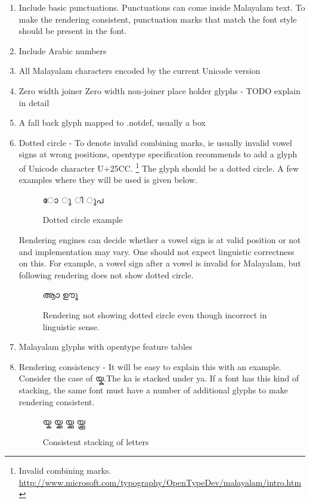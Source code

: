 \begin{enumerate}
\item Include basic punctuations. Punctuations can come inside Malayalam text.
To make the rendering consistent, punctuation marks that match the font style 
should be present in the font.
\item Include Arabic numbers
\item All Malayalam characters encoded by the current Unicode version
\item Zero width joiner Zero width non-joiner place holder glyphs - TODO 
explain in detail
\item A fall back glyph mapped to .notdef, usually a box
\item Dotted circle - To denote invalid combining marks, ie usually invalid
vowel signs at wrong positions, opentype specification
recommends to add a glyph of Unicode character U+25CC.
\footnote{Invalid combining marks. 
\url{http://www.microsoft.com/typography/OpenTypeDev/malayalam/intro.htm}}
The glyph should be a 
dotted circle. A few examples where they will be used is given below.
\begin{figure}[h]
  \centering
  {\meera\textexample ോ ു ി ുപ }\\
  \caption{Dotted circle example}
\end{figure}

Rendering engines can decide whether a vowel sign is at valid position or not
and implementation may vary.
One should not expect linguistic correctness on this. For example, a vowel sign
after a vowel is invalid for Malayalam, but following rendering does not show
dotted circle.

\begin{figure}[h]
  \centering
  {\meera\textexample ആാ ഊൂ }\\
  \caption{Rendering not showing dotted circle even though incorrect in
linguistic sense.}
\end{figure}

\item Malayalam glyphs with opentype feature tables
\item Rendering consistency - It will be easy to explain this with an example.
Consider the case of {\malayalam യ്ക}.The ka is stacked under ya. If a font has
this kind of stacking, the same font must have a number of additional glyphs to
make rendering consistent.
\begin{figure}[h!]
  \centering
  {\meera\textexample യ്ക യ്ക്ക യ്ക്കു യ്ക്കൂ }\\
  \caption{Consistent stacking of letters}
\end{figure}


\end{enumerate}
